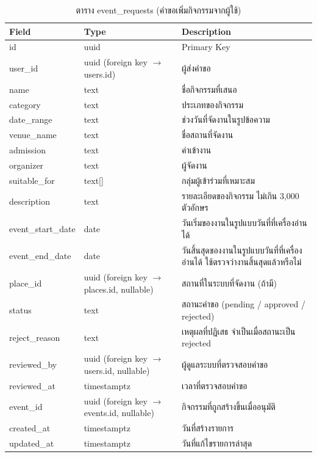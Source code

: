 \begin{table}[H]
\centering
\caption{ตาราง event\_requests (คำขอเพิ่มกิจกรรมจากผู้ใช้)}
\label{tab:db_eventrequests}
\begin{tabular}{|p{3.6cm}|p{2.6cm}|p{6.8cm}|}
\hline
\textbf{Field} & \textbf{Type} & \textbf{Description} \\
\hline
id & uuid & Primary Key \\ \hline
user\_id & uuid (foreign key $\to$ users.id) & ผู้ส่งคำขอ \\ \hline
name & text & ชื่อกิจกรรมที่เสนอ \\ \hline
category & text & ประเภทของกิจกรรม \\ \hline
date\_range & text & ช่วงวันที่จัดงานในรูปข้อความ \\ \hline
venue\_name & text & ชื่อสถานที่จัดงาน \\ \hline
admission & text & ค่าเข้างาน \\ \hline
organizer & text & ผู้จัดงาน \\ \hline
suitable\_for & text[] & กลุ่มผู้เข้าร่วมที่เหมาะสม \\ \hline
description & text & รายละเอียดของกิจกรรม ไม่เกิน 3,000 ตัวอักษร \\ \hline
event\_start\_date & date & วันเริ่มของงานในรูปแบบวันที่ที่เครื่องอ่านได้ \\ \hline
event\_end\_date & date & วันสิ้นสุดของงานในรูปแบบวันที่ที่เครื่องอ่านได้ ใช้ตรวจว่างานสิ้นสุดแล้วหรือไม่ \\ \hline
place\_id & uuid (foreign key $\to$ places.id, nullable) & สถานที่ในระบบที่จัดงาน (ถ้ามี) \\ \hline
status & text & สถานะคำขอ (pending / approved / rejected) \\ \hline
reject\_reason & text & เหตุผลที่ปฏิเสธ จำเป็นเมื่อสถานะเป็น rejected \\ \hline
reviewed\_by & uuid (foreign key $\to$ users.id, nullable) & ผู้ดูแลระบบที่ตรวจสอบคำขอ \\ \hline
reviewed\_at & timestamptz & เวลาที่ตรวจสอบคำขอ \\ \hline
event\_id & uuid (foreign key $\to$ events.id, nullable) & กิจกรรมที่ถูกสร้างขึ้นเมื่ออนุมัติ \\ \hline
created\_at & timestamptz & วันที่สร้างรายการ \\ \hline
updated\_at & timestamptz & วันที่แก้ไขรายการล่าสุด \\
\hline
\end{tabular}
\end{table}


